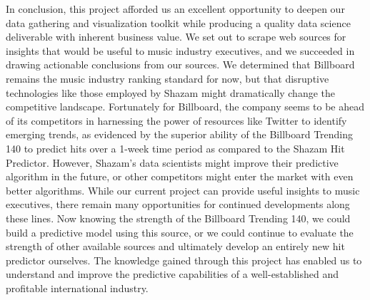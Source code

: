 \documentclass{article}
\begin{document}
In conclusion, this project afforded us an excellent opportunity to deepen our data gathering and visualization toolkit while producing a quality data science deliverable with inherent business value. We set out to scrape web sources for insights that would be useful to music industry executives, and we succeeded in drawing actionable conclusions from our sources. We determined that Billboard remains the music industry ranking standard for now, but that disruptive technologies like those employed by Shazam might dramatically change the competitive landscape. Fortunately for Billboard, the company seems to be ahead of its competitors in harnessing the power of resources like Twitter to identify emerging trends, as evidenced by the superior ability of the Billboard Trending 140 to predict hits over a 1-week time period as compared to the Shazam Hit Predictor. However, Shazam's data scientists might improve their predictive algorithm in the future, or other competitors might enter the market with even better algorithms. While our current project can provide useful insights to music executives, there remain many opportunities for continued developments along these lines. Now knowing the strength of the Billboard Trending 140, we could build a predictive model using this source, or we could continue to evaluate the strength of other available sources and ultimately develop an entirely new hit predictor ourselves.  The knowledge gained through this project has enabled us to understand and improve the predictive capabilities of a well-established and profitable international industry.
\end{document}
